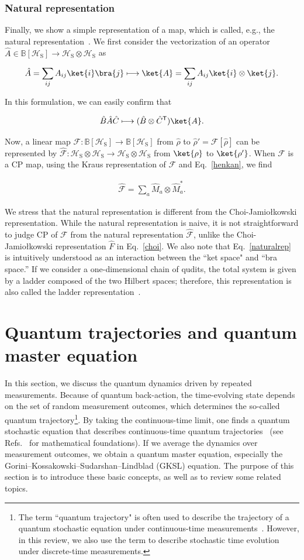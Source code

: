 \documentclass[preprint,pteplogo]{ptephy_v2}%
\numberwithin{equation}{section}
\theoremstyle{definition}
\newcommand{\mc}[1]{\mathcal{#1}}
\newcommand{\ml}[1]{\mathcal{#1}}
\newcommand{\mr}[1]{\mathrm{#1}}
\newcommand{\mbb}[1]{\mathbb{#1}}
\newcommand{\aln}[1]{
\begin{align}
#1
\end{align}
}
\newcommand{\ra}{\rightarrow}
\begin{document}
\subsubsection{Natural representation}
Finally, we show a simple representation of a map, which is called, e.g., the natural representation~\cite{watrous2018theory}.
We first consider the vectorization of an operator $\hat{A}\in\mbb{B}[\ml{H}_\mr{S}]\ra \ml{H}_\mr{S}\otimes\ml{H}_\mr{S}$ as 
\aln{
\hat{A}=\sum_{ij}A_{ij}\ket{i}\bra{j}\longmapsto \ket{A}=\sum_{ij}A_{ij}\ket{i}\otimes\ket{j}.
}
In this formulation, we can easily confirm that
\aln{\label{henkan}
\hat{B}\hat{A}\hat{C}\longmapsto (\hat{B}\otimes\hat{C}^\mathsf{T})\ket{A}.
}

Now, a linear map $\ml{F}:\mathbb{B}[\ml{H}_\mr{S}]\ra \mathbb{B}[\ml{H}_\mr{S}]$ from $\hat{\rho}$ to $\hat{\rho}'=\ml{F}[\hat{\rho}]$
can be represented by $\hat{\mc{F}}:\ml{H}_\mr{S}\otimes \ml{H}_\mr{S}\ra\ml{H}_\mr{S}\otimes \ml{H}_\mr{S}$ from $\ket{\rho}$ to $\ket{\rho'}$.
When $\ml{F}$ is a CP map, using the Kraus representation of $\mc{F}$ and Eq.~\eqref{henkan},
we find
\aln{\label{naturalrep}
\hat{\mc{F}}=\sum_a\hat{M}_a\otimes \hat{M}_a^*.
}

We stress that the natural representation is different from the Choi-Jamiołkowski representation. 
While the natural representation is naive, it is not straightforward to judge CP of $\ml{F}$ from the natural representation $\mc{\hat{F}}$, unlike the Choi-Jamiołkowski representation $\hat{F}$ in Eq.~\eqref{choi}.
We also note that Eq.~\eqref{naturalrep} is intuitively understood as an interaction between the ``ket space" and ``bra space.'' 
If we consider a one-dimensional chain of qudits, the total system is given by a ladder composed of the two Hilbert spaces; therefore, this representation is also called the ladder representation~\cite{haga2023quasiparticles}.


\section{Quantum trajectories and quantum master equation} \label{sec:trajectory_master-equation}
In this section, we discuss the quantum dynamics driven by repeated measurements. 
Because of quantum back-action, the time-evolving state depends on the set of random measurement outcomes, which determines the so-called quantum trajectory\footnote{
The term ``quantum trajectory" is often used to describe the trajectory of a quantum stochastic equation under continuous-time measurements~\cite{wiseman2009quantum}. 
However, in this review, we also use the term to describe stochastic time evolution under discrete-time measurements.
}.
By taking the continuous-time limit, one finds a quantum stochastic equation that describes continuous-time quantum trajectories~\cite{ueda1990nonequilibrium, dalibard1992wave, dum1992monte, carmichael2009open} (see Refs.~\cite{pellegrini2008existence, pellegrini2010existence, pellegrini2010markov} for mathematical foundations).
If we average the dynamics over measurement outcomes, we obtain a quantum master equation, especially the Gorini–Kossakowski–Sudarshan–Lindblad (GKSL) equation.
The purpose of this section is to introduce these basic concepts, as well as to review some related topics.
\end{document}
